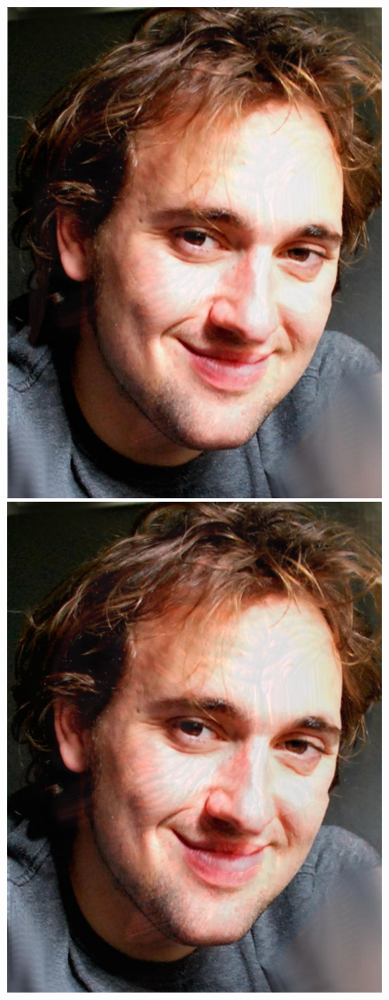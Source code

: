 \documentclass[11pt]{article}
\begin{document}
\begin{figure}[H]
\begin{center}
\includegraphics[scale=0.08]{figs/zombie/zombie_bf_03.jpg} 
\includegraphics[scale=0.08]{figs/zombie/zombie_bf_04.jpg} 

\end{center}
\end{figure}
\end{document}
